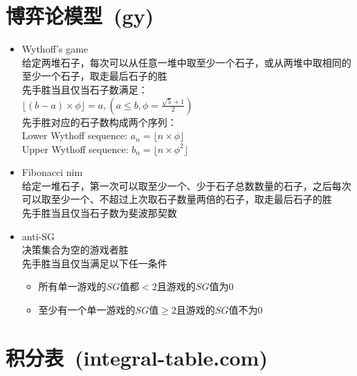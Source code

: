 \section{博弈论模型\ \small(gy)}
	\begin{itemize}[nosep,wide=0pt]
		\item Wythoff's game
			\\给定两堆石子，每次可以从任意一堆中取至少一个石子，或从两堆中取相同的至少一个石子，取走最后石子的胜
			\\先手胜当且仅当石子数满足：
			\\$\lfloor (b - a) \times \phi \rfloor=a, (a \leq b, \phi = \frac{\sqrt{5} + 1}{2})$
			\\先手胜对应的石子数构成两个序列：
			\\Lower Wythoff sequence: $a_n = \lfloor n \times \phi \rfloor$
			\\Upper Wythoff sequence: $b_n = \lfloor n \times \phi ^ 2 \rfloor$
		\item Fibonacci nim
			\\给定一堆石子，第一次可以取至少一个、少于石子总数数量的石子，之后每次可以取至少一个、不超过上次取石子数量两倍的石子，取走最后石子的胜
			\\先手胜当且仅当石子数为斐波那契数
		\item anti-SG
			\\决策集合为空的游戏者胜
			\\先手胜当且仅当满足以下任一条件
			\begin{itemize}[nosep,wide=0pt]
				\item 所有单一游戏的$ SG $值都$ < 2 $且游戏的$ SG $值为$ 0 $
				\item 至少有一个单一游戏的$ SG $值$ \geq 2 $且游戏的$ SG $值不为$ 0 $
			\end{itemize}
	\end{itemize}
\section{积分表\ \small(integral-table.com)}
	
